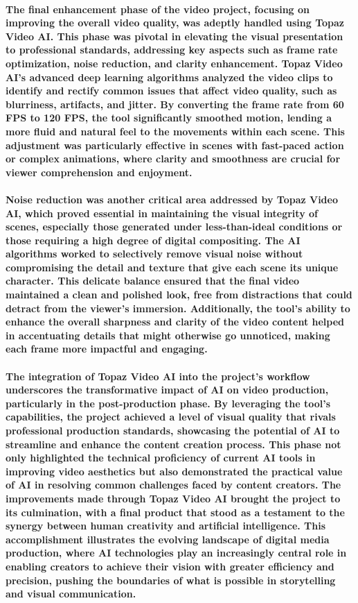 \documentclass[11pt,a4paper,oneside]{report}
\begin{document}
\paragraph{The final enhancement phase of the video project, focusing on improving the overall video quality, was adeptly handled using Topaz Video AI. This phase was pivotal in elevating the visual presentation to professional standards, addressing key aspects such as frame rate optimization, noise reduction, and clarity enhancement. Topaz Video AI's advanced deep learning algorithms analyzed the video clips to identify and rectify common issues that affect video quality, such as blurriness, artifacts, and jitter. By converting the frame rate from 60 FPS to 120 FPS, the tool significantly smoothed motion, lending a more fluid and natural feel to the movements within each scene. This adjustment was particularly effective in scenes with fast-paced action or complex animations, where clarity and smoothness are crucial for viewer comprehension and enjoyment.}

\paragraph{Noise reduction was another critical area addressed by Topaz Video AI, which proved essential in maintaining the visual integrity of scenes, especially those generated under less-than-ideal conditions or those requiring a high degree of digital compositing. The AI algorithms worked to selectively remove visual noise without compromising the detail and texture that give each scene its unique character. This delicate balance ensured that the final video maintained a clean and polished look, free from distractions that could detract from the viewer's immersion. Additionally, the tool's ability to enhance the overall sharpness and clarity of the video content helped in accentuating details that might otherwise go unnoticed, making each frame more impactful and engaging.}

\paragraph{The integration of Topaz Video AI into the project's workflow underscores the transformative impact of AI on video production, particularly in the post-production phase. By leveraging the tool's capabilities, the project achieved a level of visual quality that rivals professional production standards, showcasing the potential of AI to streamline and enhance the content creation process. This phase not only highlighted the technical proficiency of current AI tools in improving video aesthetics but also demonstrated the practical value of AI in resolving common challenges faced by content creators. The improvements made through Topaz Video AI brought the project to its culmination, with a final product that stood as a testament to the synergy between human creativity and artificial intelligence. This accomplishment illustrates the evolving landscape of digital media production, where AI technologies play an increasingly central role in enabling creators to achieve their vision with greater efficiency and precision, pushing the boundaries of what is possible in storytelling and visual communication.}
\end{document}
